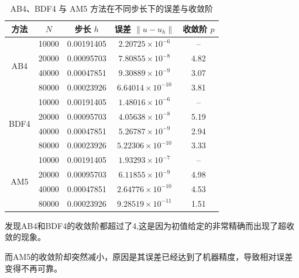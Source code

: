 \documentclass[UTF8]{ctexart}
\begin{document}
\begin{table}[H]
    \centering
    \caption{AB4、BDF4 与 AM5 方法在不同步长下的误差与收敛阶}
    \begin{tabular}{|c|c|c|c|c|}
    \hline
    方法 & $N$ & 步长 $h$ & 误差 $\|u - u_h\|$ & 收敛阶 $p$ \\
    \hline
    \multirow{4}{*}{AB4}
    & 10000 & 0.00191405  & $2.20725 \times 10^{-6}$ & --     \\
    & 20000 & 0.00095703  & $7.80855 \times 10^{-8}$ & 4.82   \\
    & 40000 & 0.00047851  & $9.30889 \times 10^{-9}$ & 3.07   \\
    & 80000 & 0.00023926  & $6.64014 \times 10^{-10}$ & 3.81  \\
    \hline
    \multirow{4}{*}{BDF4}
    & 10000 & 0.00191405  & $1.48016 \times 10^{-6}$ & --     \\
    & 20000 & 0.00095703  & $4.05638 \times 10^{-8}$ & 5.19   \\
    & 40000 & 0.00047851  & $5.26787 \times 10^{-9}$ & 2.94   \\
    & 80000 & 0.00023926  & $5.22306 \times 10^{-10}$ & 3.33  \\
    \hline
    \multirow{4}{*}{AM5}
    & 10000 & 0.00191405  & $1.93293 \times 10^{-7}$ & --     \\
    & 20000 & 0.00095703  & $6.11855 \times 10^{-9}$ & 4.98   \\
    & 40000 & 0.00047851  & $2.64776 \times 10^{-10}$ & 4.53  \\
    & 80000 & 0.00023926  & $9.28519 \times 10^{-11}$ & 1.51  \\
    \hline
    \end{tabular}
\end{table}

发现AB4和BDF4的收敛阶都超过了4,这是因为初值给定的非常精确而出现了超收敛的现象。

而AM5的收敛阶却突然减小，原因是其误差已经达到了机器精度，导致相对误差变得不再可靠。

\end{document}
